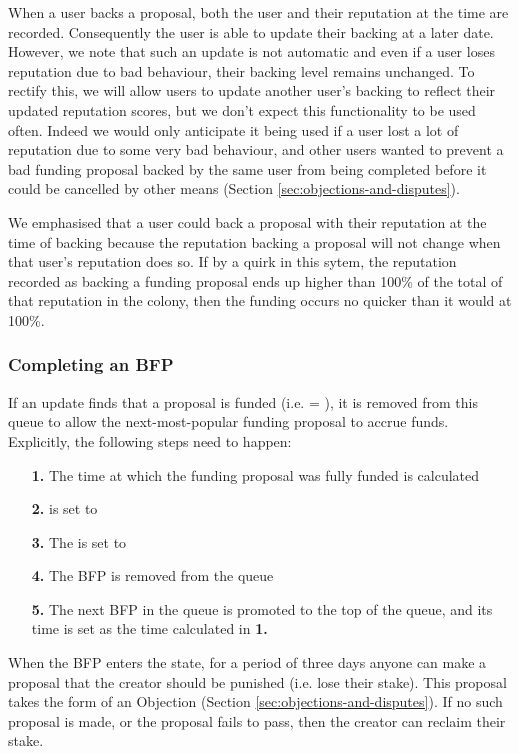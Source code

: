 When a user backs a proposal, both the user and their reputation at the time are recorded. Consequently the user is able to update their backing at a later date. However, we note that such an update is not automatic and even if a user loses reputation due to bad behaviour, their backing level remains unchanged. To rectify this, we will allow users to update another user's backing to reflect their updated reputation scores, but we don't expect this functionality to be used often. Indeed we would only anticipate it being used if a user lost a lot of reputation due to some very bad behaviour, and other users wanted to prevent a bad funding proposal backed by the same user from being completed before it could be cancelled by other means (Section \ref{sec:objections-and-disputes}).

We emphasised that a user could back a proposal with their reputation at the time of backing because the reputation backing a proposal will not change when that user's reputation does so. If by a quirk in this sytem, the reputation recorded as backing a funding proposal ends up higher than 100\% of the total of that reputation in the colony, then the funding occurs no quicker than it would at 100\%.

\subsubsection*{Completing an BFP}
If an update finds that a proposal is funded (i.e.  = ), it is removed from this queue to allow the next-most-popular funding proposal to accrue funds. Explicitly, the following steps need to happen:
\begin{itemize}
 \item[\textbf{1.}] The time at which the funding proposal was fully funded is calculated%
 \item[\textbf{2.}]  is set to 
 \item[\textbf{3.}] The  is set to 
 \item[\textbf{4.}] The BFP is removed from the queue
 \item[\textbf{5.}] The next BFP in the queue is promoted to the top of the queue, and its  time is set as the time calculated in \textbf{1.}
\end{itemize}


When the BFP enters the  state, for a period of three days anyone can make a proposal that the creator should be punished (i.e. lose their stake). This proposal takes the form of an Objection (Section \ref{sec:objections-and-disputes}). If no such proposal is made, or the proposal fails to pass, then the creator can reclaim their stake.

